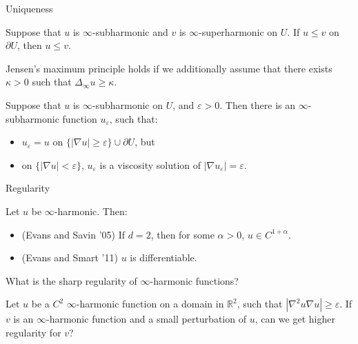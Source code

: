 \documentclass[10pt]{beamer}
\newcommand{\RR}{\mathbb{R}}
\begin{document}
\begin{frame}{Uniqueness}
\begin{theorem}
Suppose that $u$ is $\infty$-subharmonic and $v$ is $\infty$-superharmonic on $U$.
If $u \leq v$ on $\partial U$, then $u \leq v$. \pause
\end{theorem}

\begin{lemma}
Jensen's maximum principle holds if we additionally assume that there exists $\kappa > 0$ such that $\Delta_\infty u \geq \kappa$. \pause
\end{lemma}

\begin{lemma}
Suppose that $u$ is $\infty$-subharmonic on $U$, and $\varepsilon > 0$.
Then there is an $\infty$-subharmonic function $u_\varepsilon$, such that: \pause
\begin{itemize}
\item $u_\varepsilon = u$ on $\{|\nabla u| \geq \varepsilon\} \cup \partial U$, but  
\item on $\{|\nabla u| < \varepsilon\}$, $u_\varepsilon$ is a viscosity solution of $|\nabla u_\varepsilon| = \varepsilon$.
\end{itemize}
\end{lemma}
\end{frame}

\begin{frame}{Regularity}
\begin{theorem}
Let $u$ be $\infty$-harmonic. Then: 
\begin{itemize}
\item (Evans and Savin '05) If $d = 2$, then for some $\alpha > 0$, $u \in C^{1 + \alpha}$. 
\item (Evans and Smart '11) $u$ is differentiable. \pause
\end{itemize}
\end{theorem}

\begin{problem}
    What is the sharp regularity of $\infty$-harmonic functions? \pause
\end{problem}

\begin{problem}
    Let $u$ be a $C^2$ $\infty$-harmonic function on a domain in $\RR^2$, such that $|\nabla^2 u \nabla u| \geq \varepsilon$.
    If $v$ is an $\infty$-harmonic function and a small perturbation of $u$, can we get higher regularity for $v$?
\end{problem}
\end{frame}
\end{document}
